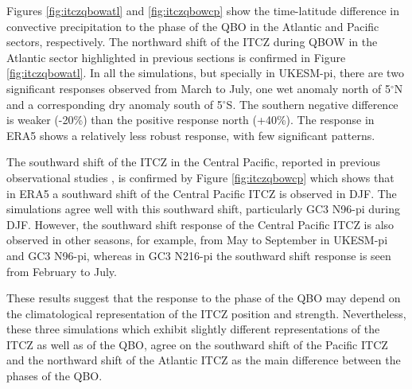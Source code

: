 Figures \ref{fig:itczqbowatl} and \ref{fig:itczqbowcp} show the time-latitude difference in convective precipitation to the phase of the QBO in the Atlantic and Pacific sectors, respectively. 
The northward shift of the ITCZ during QBOW in the Atlantic sector highlighted in previous sections is confirmed in Figure \ref{fig:itczqbowatl}. In all the simulations, but specially in UKESM-pi, there are two significant responses observed from March to July, one wet anomaly north of 5$^\circ$N and a corresponding dry anomaly south of 5$^\circ$S. The southern negative difference is weaker (-20\%) than the positive response north (+40\%). 
The response in ERA5 shows a relatively less robust response, with few significant patterns. %

The southward shift of the ITCZ in the Central Pacific, reported in previous observational studies \citep{gray2018}, is confirmed by Figure \ref{fig:itczqbowcp} which shows that in ERA5 a southward shift of the Central Pacific ITCZ is observed in DJF. 
The simulations agree well with this southward shift, particularly GC3 N96-pi during DJF. However, the southward shift response of the Central Pacific ITCZ is also observed in other seasons, for example, from May to September in UKESM-pi and GC3 N96-pi, whereas in GC3 N216-pi the southward shift response is seen from February to July.


These results suggest that the response to the phase of the QBO may depend on the climatological representation of the ITCZ position and strength. Nevertheless, these three simulations which exhibit slightly different representations of the ITCZ as well as of the QBO, agree on the southward shift of the Pacific ITCZ and the northward shift of the Atlantic ITCZ as the main difference between the phases of the QBO. 


